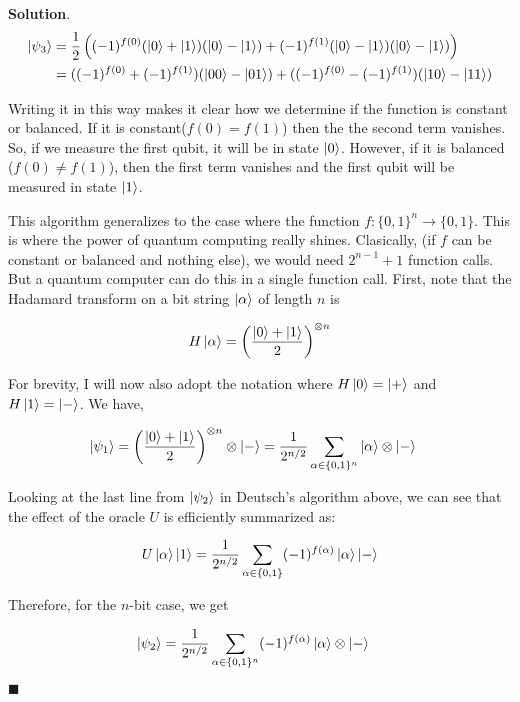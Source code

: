 \documentclass[12pt]{article}
\theoremstyle{definition}
\newenvironment{s}{%
        \begin{trivlist} \item \textbf{Solution}. }{%
            \hspace*{\fill} $\blacksquare$\end{trivlist}}%
\begin{document}
{\begin{s}
\begin{align*}
\ket{\psi_{3}} &=  \frac{1}{2}\left((-1)^{f(0)}(\ket{0}+\ket{1})(\ket{0}-\ket{1}) + (-1)^{f(1)}(\ket{0}-\ket{1})(\ket{0}-\ket{1})\right)\\
&= ((-1)^{f(0)} + (-1)^{f(1)})(\ket{00} - \ket{01}) + ((-1)^{f(0)} - (-1)^{f(1)})(\ket{10} - \ket{11})
\end{align*}

Writing it in this way makes it clear how we determine if the function is constant or balanced. If it is constant($f(0)=f(1)$) then the the second term vanishes. So, if we measure the first qubit, it will be in state $\ket{0}$. However, if it is balanced ($f(0)\neq f(1)$), then the first term vanishes and the first qubit will be measured in state $\ket{1}$.

\vspace{0.1in}

This algorithm generalizes to the case where the function $f: \{0,1\}^{n}\rightarrow \{0,1\}$. This is where the power of quantum computing really shines. Clasically, (if $f$ can be constant or balanced and nothing else), we would need $2^{n-1} + 1$ function calls. But a quantum computer can do this in a single function call. First, note that the Hadamard transform on a bit string $\ket{\alpha}$ of length $n$ is 

\begin{align*}
H\ket{\alpha} = \left(\frac{\ket{0}+\ket{1}}{2}\right)^{\otimes n}
\end{align*}

For brevity, I will now also adopt the notation where $H\ket{0} = \ket{+}$ and $H\ket{1} = \ket{-}$. We have,

\begin{align*}
\ket{\psi_{1}} &= \left(\frac{\ket{0}+\ket{1}}{2}\right)^{\otimes n}\otimes \ket{-} = \frac{1}{2^{n/2}} \sum_{\alpha\in\{0,1\}^{n}} \ket{\alpha}\otimes \ket{-}
\end{align*}

Looking at the last line from $\ket{\psi_{2}}$ in Deutsch's algorithm above, we can see that the effect of the oracle $U$ is efficiently summarized as:

\begin{align*}
U\ket{\alpha}\ket{1} = \frac{1}{2^{n/2}}\sum_{\alpha\in\{0,1\}} (-1)^{f(\alpha)}\ket{\alpha}\ket{-}
\end{align*}

Therefore, for the $n$-bit case, we get

\begin{align*}
\ket{\psi_{2}} &= \frac{1}{2^{n/2}} \sum_{\alpha\in\{0,1\}^{n}} (-1)^{f(\alpha)}\ket{\alpha}\otimes \ket{-}
\end{align*}



\end{s}
\end{document}
